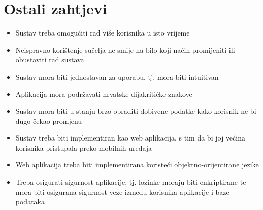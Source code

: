 		\section{Ostali zahtjevi}
			 \begin{itemize}
			 	\item  Sustav treba omogućiti rad više korisnika u isto vrijeme
			 	\item  Neispravno korištenje sučelja ne smije na bilo koji način promijeniti ili obustaviti rad sustava
			 	\item  Sustav mora biti jednostavan za uporabu, tj. mora biti intuitivan
			 	\item Aplikacija mora podržavati hrvatske dijakritičke znakove
			 	\item  Sustav mora biti u stanju brzo obraditi dobivene podatke kako korisnik ne bi dugo čekao promjenu
			 	\item  Sustav treba biti implementiran kao web aplikacija, s tim da bi joj većina korisnika pristupala preko mobilnih uređaja
			 	\item Web aplikacija treba biti implementirana koristeći objektno-orijentirane jezike
			 	\item  Treba osigurati sigurnost aplikacije, tj. lozinke moraju biti enkriptirane te mora biti osigurana sigurnost veze između korisnika aplikacije i baze podataka 
			 \end{itemize}